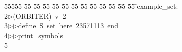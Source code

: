 %
%
\begin{tabbing}
55555 \= 55 \= 55 \= 55 \= 55 \= 55 \= 55 \= 55 \= 55 \= 55 \= 55 \= 55 \= 55 \= \>example\_set:\\[0pt]
2\>$\triangleright$\>(ORBITER)\ v\ 2\ \\[0pt]
3\>$\triangleright$\>$\triangleright$\>define\ S\ set\ here\ 23571113\ end\ \\[0pt]
4\>$\triangleright$\>$\triangleright$\>print\_symbols\\[0pt]
5\>\end{tabbing}
